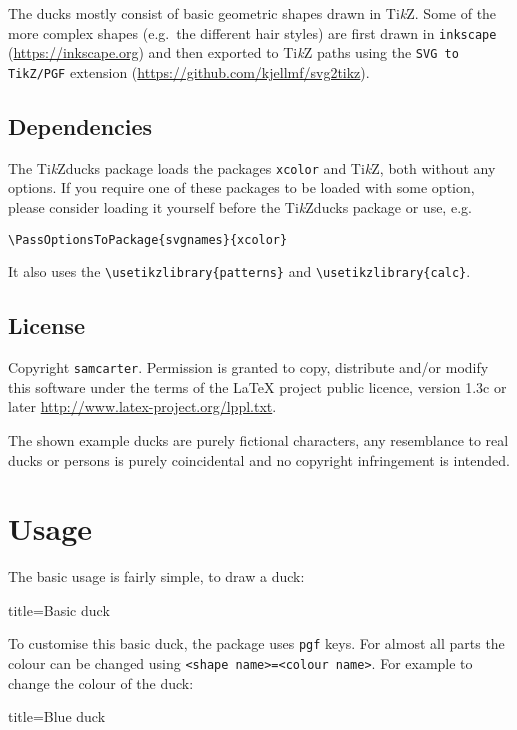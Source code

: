 \documentclass[parskip=half]{scrartcl}
\newcommand{\TikZ}{Ti\emph{k}Z\xspace}
\newcommand{\tikzducks}{Ti\emph{k}Zducks\xspace}
\begin{document}
The ducks mostly consist of basic geometric shapes drawn in \TikZ. Some of the more complex shapes (e.g.\ the different hair styles) are first drawn in \texttt{inkscape} (\url{https://inkscape.org}) and then exported to \TikZ paths using the \texttt{SVG to TikZ/PGF} extension (\url{https://github.com/kjellmf/svg2tikz}).

\subsection{Dependencies}

The \tikzducks package loads the packages \lstinline|xcolor| and \TikZ, both without any options. If you require one of these packages to be loaded with some option, please consider loading it yourself before the \tikzducks package or use, e.g.

\begin{lstlisting}[aboveskip=1.2em,morekeywords={xcolor,svgnames}]
	\PassOptionsToPackage{svgnames}{xcolor}
\end{lstlisting}
It also uses the \lstinline|\usetikzlibrary{patterns}| and \lstinline|\usetikzlibrary{calc}|.

\subsection{License}

Copyright 
\texttt{samcarter}. Permission is granted to copy, distribute and\slash or modify this software under the terms of the LaTeX project public licence, version 1.3c or later \url{http://www.latex-project.org/lppl.txt}.

The shown example ducks are purely fictional characters, any resemblance to real ducks or persons is purely coincidental and no copyright infringement is intended.

\section{Usage}

The basic usage is fairly simple, to draw a duck:
\begin{tcblisting}{title={Basic duck}}
\begin{tikzpicture}
	\duck
\end{tikzpicture}
\end{tcblisting}

To customise this basic duck, the package uses \lstinline|pgf| keys. For almost all parts the colour can be changed using \lstinline|<shape name>=<colour name>|. For example to change the colour of the duck:
\begin{tcblisting}{title={Blue duck}}
\begin{tikzpicture}
	\duck[body=blue]
\end{tikzpicture}
\end{tcblisting}
\end{document}

